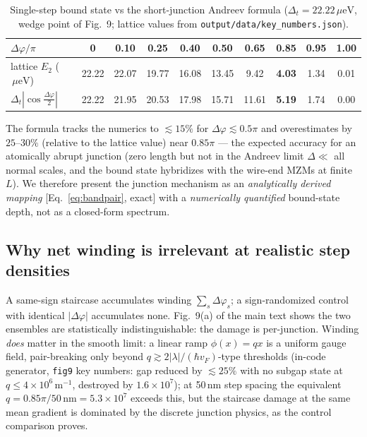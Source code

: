\documentclass[11pt]{article}
\newcommand{\ueV}{\,\mu\mathrm{eV}}
\begin{document}
\begin{table}[h]\centering\small
\caption{Single-step bound state vs the short-junction Andreev formula
($\Delta_t = 22.22\ueV$, wedge point of Fig.~9; lattice values from
\texttt{output/data/key\_numbers.json}).}
\label{t:abs}
\begin{tabular}{lccccccccc}
\toprule
$\Delta\varphi/\pi$ & 0 & 0.10 & 0.25 & 0.40 & 0.50 & 0.65 & \textbf{0.85} & 0.95 & 1.00\\
\midrule
lattice $E_2$ ($\ueV$) & 22.22 & 22.07 & 19.77 & 16.08 & 13.45 & 9.42 & \textbf{4.03} & 1.34 & 0.01\\
$\Delta_t|\cos\frac{\Delta\varphi}{2}|$ & 22.22 & 21.95 & 20.53 & 17.98 & 15.71 & 11.61 & \textbf{5.19} & 1.74 & 0.00\\
\bottomrule
\end{tabular}
\end{table}

The formula tracks the numerics to $\lesssim 15\%$ for
$\Delta\varphi \lesssim 0.5\pi$ and overestimates by $25$--$30\%$ (relative
to the lattice value) near $0.85\pi$ --- the expected accuracy for an atomically abrupt junction
(zero length but not in the Andreev limit $\Delta \ll$ all normal scales,
and the bound state hybridizes with the wire-end MZMs at finite $L$). We
therefore present the junction mechanism as an \emph{analytically derived
mapping} [Eq.~\eqref{eq:bandpair}, exact] with a \emph{numerically
quantified} bound-state depth, not as a closed-form spectrum.

\subsection{Why net winding is irrelevant at realistic step densities}
A same-sign staircase accumulates winding
$\sum_s \Delta\varphi_s$; a sign-randomized control with identical
$|\Delta\varphi|$ accumulates none. Fig.~9(a) of the main text shows the
two ensembles are statistically indistinguishable: the damage is
per-junction. Winding \emph{does} matter in the smooth limit: a linear
ramp $\phi(x) = qx$ is a uniform gauge field, pair-breaking only beyond
$q \gtrsim 2|\lambda|/(\hbar v_F)$-type thresholds (in-code generator,
\texttt{fig9} key numbers: gap reduced by $\lesssim 25\%$ with no subgap
state at $q \le 4\times10^6$\,m$^{-1}$, destroyed by $1.6\times10^7$); at 50\,nm step spacing the equivalent
$q = 0.85\pi/50\,\mathrm{nm} = 5.3\times10^7$ exceeds this, but the
staircase damage at the same mean gradient is dominated by the discrete
junction physics, as the control comparison proves.
\end{document}
